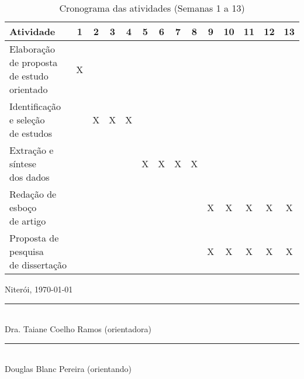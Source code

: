 \documentclass[12pt]{article}
\begin{document}
\begin{table}[!ht]
\caption{Cronograma das atividades (Semanas 1 a 13)}

\begin{tabular}{|l|c|c|c|c|c|c|c|c|c|c|c|c|c|}
\hline

\textbf{Atividade} & \textbf{1} & \textbf{2} & \textbf{3} & \textbf{4} & \textbf{5} & \textbf{6} & \textbf{7} &  \textbf{8} &  \textbf{9} & \textbf{10} & \textbf{11} & \textbf{12} & \textbf{13}  \\ 
  \hline
  \makecell[l]{Elaboração de proposta \\ de estudo orientado} & X & & & & & & & & & & & & \\
  \hline
  \makecell[l]{Identificação e seleção \\ de estudos} & & X & X & X & & & & & & & & & \\
  \hline
  \makecell[l]{Extração e síntese \\ dos dados} & & & & & X & X & X & X & & & & & \\
  \hline     
  \makecell[l]{Redação de esboço \\ de artigo} & & & & & & & & & X & X & X & X & X \\
  \hline
  \makecell[l]{Proposta de pesquisa \\ de dissertação} & & & & & & & & & X & X & X & X & X \\
  \hline
   
\end{tabular}
\label{tab:cronograma}
\end{table} 

\FloatBarrier

 

\vfill

\begin{flushright}
Niterói, \today
\end{flushright}

\vspace{3cm}

\begin{center}
    \begin{minipage}{0.6\textwidth}
        \centering
        \rule{\linewidth}{0.4pt} \\
        Dra. Taiane Coelho Ramos (orientadora)
    \end{minipage}
\end{center}

\vspace{2cm}

\begin{center}
    \begin{minipage}{0.6\textwidth}
        \centering
        \rule{\linewidth}{0.4pt} \\
        Douglas Blanc Pereira (orientando)
    \end{minipage}
\end{center}
\end{document}
